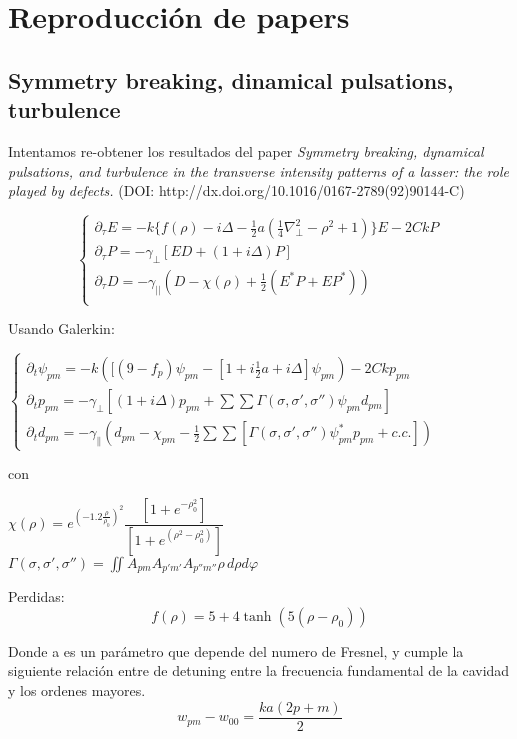 \section{Reproducción de papers}

	\subsection{Symmetry breaking, dinamical pulsations, turbulence}
	
	Intentamos re-obtener los resultados del paper \textit{Symmetry breaking, dynamical pulsations, and turbulence in the transverse intensity patterns of a lasser: the role played by defects.} (DOI: http://dx.doi.org/10.1016/0167-2789(92)90144-C)
	
	
		\[
		\begin{cases}
		\partial_{\tau}E=-k\{ f(\rho) -i\Delta -\tfrac{1}{2}a(\tfrac{1}{4}\nabla^2_{\bot} - \rho^2 +1) \}E - 2 C k P\\
		\partial_{\tau} P=-\gamma_{\bot}[ED + (1+i\Delta)P] \\
		\partial_{\tau} D=-\gamma_{||}(D-\chi(\rho)+\tfrac{1}{2}(E^*P+EP^*)) \\
		\end{cases}
		\]
		
		Usando Galerkin:
		
		$\begin{cases}
		\partial_t \psi_{pm}=-k\left([(9-f_{p})\psi_{pm}-\left[1+ i\tfrac{1}{2}a +i\Delta \right]\psi_{pm}\right)-2Ckp_{pm}\\
		\partial_t p_{pm}=-\gamma_{\bot}[(1+i\Delta)p_{pm}+\sum\sum \Gamma (\sigma, \sigma', \sigma'') \psi_{pm}d_{pm}]\\
		\partial_t d_{pm}=-\gamma_{\parallel}(d_{pm}-\chi_{pm}-\tfrac{1}{2}\sum\sum [\Gamma (\sigma, \sigma', \sigma'') \psi_{pm}^*p_{pm} + c.c.])
		\end{cases}$
		
		con
		
		$\chi(\rho)=e^{(-1.2 \frac{\rho}{\rho_0})^2}\dfrac{[1+e^{-\rho_0^2}]}{[1+e^{(\rho^2-\rho_0^2)}]}$\\
		$\Gamma (\sigma, \sigma', \sigma'')=\iint A_{pm}A_{p'm'}A_{p''m''}\rho \, d\!\rho d\!\varphi  $
		

	
	Perdidas:	
	\[f(\rho)=5+4\tanh(5(\rho-\rho_0))\]
	
	Donde a es un parámetro que depende del numero de Fresnel, y cumple la siguiente relación entre de detuning entre la frecuencia fundamental de la cavidad y los ordenes mayores.
	\[w_{pm}-w_{00}=\frac{ka(2p+m)}{2} \]
	
